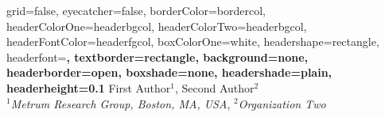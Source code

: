 \documentclass[portrait,fontscale=0.46,paperwidth=36in,paperheight=48in]{baposter}
\begin{document}

\background{
}

\begin{poster}{
	grid=false,
	eyecatcher=false, 
	borderColor=bordercol,
	headerColorOne=headerbgcol,
	headerColorTwo=headerbgcol,
	headerFontColor=headerfgcol,
	boxColorOne=white,
	headershape=rectangle,
	headerfont=\Large\bf\textsf,
	textborder=rectangle,
	background=none,
	headerborder=open,
  boxshade=none, 
  headershade=plain,
  headerheight=0.1\textheight %
}
{
}
{
	\textbf{\textsf{\color{titlefgcol}{The title of my poster}}}\vspace{.5em}
}
{
	First Author$^1$, Second Author$^2$\\
	{\smaller
	  $^1$\textit{Metrum Research Group, Boston, MA, USA}, $^2$\textit{Organization Two}
	}
}
{
		
}
\end{poster}
\end{document}
